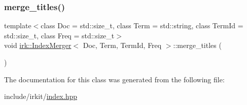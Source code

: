 \subsubsection{\texorpdfstring{merge\+\_\+titles()}{merge\_titles()}}
{\footnotesize\ttfamily template$<$class Doc  = std\+::size\+\_\+t, class Term  = std\+::string, class Term\+Id  = std\+::size\+\_\+t, class Freq  = std\+::size\+\_\+t$>$ \\
void \mbox{\hyperlink{classirk_1_1IndexMerger}{irk\+::\+Index\+Merger}}$<$ Doc, Term, Term\+Id, Freq $>$\+::merge\+\_\+titles (\begin{DoxyParamCaption}{ }\end{DoxyParamCaption})\hspace{0.3cm}{\ttfamily [inline]}}



The documentation for this class was generated from the following file\+:\begin{DoxyCompactItemize}
\item 
include/irkit/\mbox{\hyperlink{irkit_2index_8hpp}{index.\+hpp}}\end{DoxyCompactItemize}
